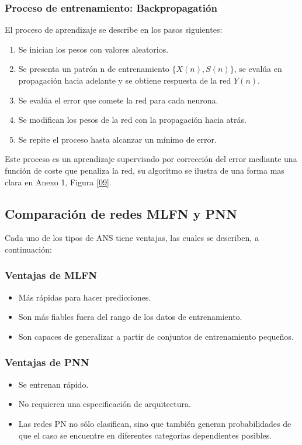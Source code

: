 \documentclass[11pt,titlepage]{report}
\begin{document}
\subsubsection{Proceso de entrenamiento: Backpropagatión} 
El proceso de aprendizaje se describe en los pasos siguientes:

\begin{enumerate}
\item Se inician los pesos con valores aleatorios.
\item Se presenta un patrón n de entrenamiento $\{X(n), S(n)\}$, se evalúa en propagación hacia adelante y se obtiene respuesta de la red $Y(n)$.
\item  Se evalúa el error que comete la red para cada neurona.
\item Se modifican los pesos de la red con la propagación hacia atrás.
\item Se repite el proceso hasta alcanzar un mínimo de error.
\end{enumerate}

Este proceso es un aprendizaje supervisado por corrección del error mediante una función de coste que penaliza la red, su algoritmo se ilustra de una forma mas clara en Anexo 1, Figura \ref{09}. 

\subsection{Comparación de redes MLFN y PNN}
Cada uno de los tipos de ANS tiene ventajas, las cuales se describen, a continuación:
\subsubsection{Ventajas de MLFN}
\begin{itemize}
	\item Más rápidas para hacer predicciones.
	\item Son más fiables fuera del rango de los datos de entrenamiento.
	\item Son capaces de generalizar a partir de conjuntos de entrenamiento
	pequeños.
\end{itemize}

\subsubsection{Ventajas de PNN}  
\begin{itemize} 
	\item Se entrenan rápido.
	\item No requieren una especificación de arquitectura.
	\item Las redes PN no sólo clasifican, sino que también generan
	probabilidades de que el caso se encuentre en diferentes categorías dependientes posibles. \cite{Guia17}
\end{itemize}
\end{document}

